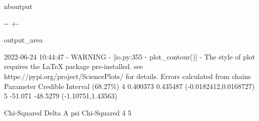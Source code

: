 \documentclass[letterpaper,10pt,english]{sphinxmanual}
\newlength\nbsphinxcodecellspacing
\begin{document}
\begin{sphinxuseclass}{nboutput}
{

\kern-\sphinxverbatimsmallskipamount\kern-\baselineskip
\kern+\FrameHeightAdjust\kern-\fboxrule
\vspace{\nbsphinxcodecellspacing}

\begin{sphinxuseclass}{output_area}
\begin{sphinxuseclass}{}


\begin{sphinxVerbatim}[commandchars=\\\{\}]
2022-06-24 10:44:47 - WARNING - [io.py:355 - plot\_contour()] - The style of plot requires the LaTeX package pre-installed. see https://pypi.org/project/SciencePlots/ for details.
Errors calculated from chains
 Parameter   Credible Interval (68.27\%)
     4     0.400373     0.435487    (-0.0182412,0.0168727)
     5      -51.071     -48.5279    (-1.10751,1.43563)

     Chi-Squared    Delta                A           psi
                 Chi-Squared             4             5


\end{sphinxVerbatim}
\end{sphinxuseclass}
\end{sphinxuseclass}}
\end{sphinxuseclass}
\end{document}
